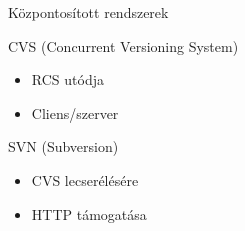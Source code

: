 
\begin{frame}{Központosított rendszerek}
    \pause
    \begin{block}{CVS (Concurrent Versioning System)}
        \begin{itemize}
            \pause \item RCS utódja
            \pause \item Cliens/szerver
        \end{itemize}
    \end{block}
    \pause
    \begin{block}{SVN (Subversion)}
        \begin{itemize}
            \pause \item CVS lecserélésére
            \pause \item HTTP támogatása
        \end{itemize}
    \end{block}
\end{frame}

